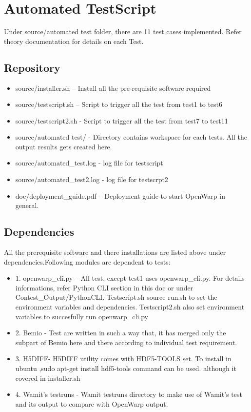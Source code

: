 \documentclass[12pt]{article}
\begin{document}
\section{Automated TestScript}

Under source/automated test folder, there are  11 test cases implemented. Refer theory documentation for details on each Test.

\subsection{Repository}
\begin{itemize}
\item source/installer.sh – Install all the pre-requisite software required
\item source/testscript.sh – Script to trigger all the test from test1 to test6
\item source/testscript2.sh - Script to trigger all the test from test7 to test11
\item source/automated test/ - Directory contains workspace  for each tests. All the output results gets created here.
\item source/automated_test.log - log file for testscript
\item source/automated_test2.log - log file for testscrpt2
\item doc/deployment_guide.pdf – Deployment guide to start OpenWarp in general.
\end{itemize}

\subsection{Dependencies}
All the prerequisite software and there installations are listed above under dependencies.Following modules are dependent to tests:
\begin{itemize}
\item 1.	openwarp_cli.py – All test, except test1 uses openwarp_cli.py. For details informations, refer Python CLI section in this doc or under Contest_Output/PythonCLI. Testscript.sh source run.sh to set the environment variables and dependencies. Testscript2.sh also set environment variables to succesfully run openwarp_cli.py
\item 2.	Bemio - Test are written in such a way that, it has merged only the subpart of Bemio here and there according to individual test requirement.
\item 3.	H5DIFF- H5DIFF utility comes with HDF5-TOOLS set. To install in ubuntu ,sudo apt-get install hdf5-tools command can be used. although it covered in installer.sh
\item 4.	Wamit’s testruns -  Wamit testruns directory to make use of Wamit's test and its output to compare with OpenWarp output.
\end{itemize}
\end{document}
